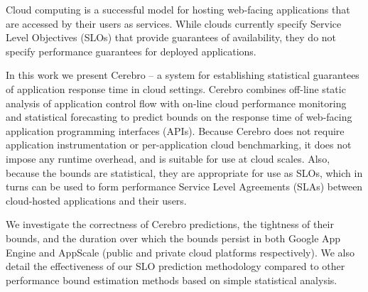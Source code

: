 Cloud computing is a successful model for hosting web-facing
applications that are accessed by their users as services.  While clouds
currently specify Service Level Objectives (SLOs) that provide guarantees of
availability, they do not specify performance guarantees for deployed
applications.

In this work we present Cerebro -- a system for establishing statistical
guarantees of application response time in cloud settings.  Cerebro combines
off-line static analysis of application control flow with on-line cloud
performance monitoring and statistical forecasting to predict bounds on the
response time of web-facing application programming interfaces (APIs).
Because Cerebro does not require application instrumentation or 
per-application cloud benchmarking, it does not impose any runtime overhead,
and is suitable for use at cloud scales.  Also, because the bounds are
statistical, they are appropriate for use as SLOs, which in turns can be 
used to form performance Service Level Agreements (SLAs) between 
cloud-hosted applications and their users.

We investigate the correctness of Cerebro predictions, the tightness of their
bounds, and the duration over which the bounds persist in both Google App
Engine and AppScale (public and private cloud platforms respectively).  
We also detail the effectiveness of our SLO prediction methodology compared 
to other performance bound estimation methods based on simple statistical
analysis. 


